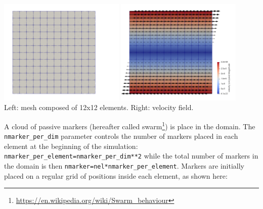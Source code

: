 \documentclass[a4paper]{article}
\begin{document}
\begin{center}
\includegraphics[width=6cm]{images/mesh}
\includegraphics[width=6cm]{images/vel}\\
Left: mesh composed of 12x12 elements. Right: velocity field.
\end{center}

A cloud of passive markers (hereafter called swarm\footnote{\url{https://en.wikipedia.org/wiki/Swarm_behaviour}}) is 
place in the domain. 
The \lstinline{nmarker_per_dim} parameter controls the number of
markers placed in each element at the beginning of the simulation:
\lstinline{nmarker_per_element=nmarker_per_dim**2}
while the total number of markers in the domain is then 
\lstinline{nmarker=nel*nmarker_per_element}.
Markers are initially placed on a regular grid of positions inside each element, as shown 
here: 
\end{document}
